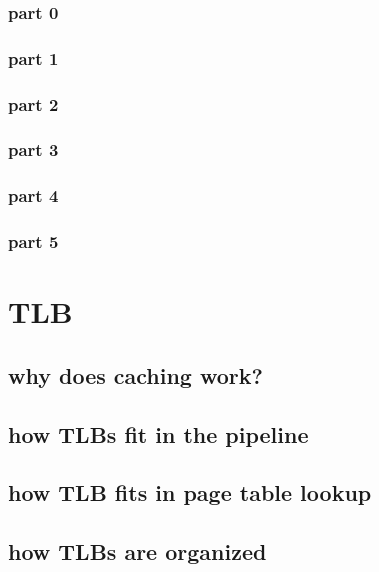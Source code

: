 \subsubsection{part 0}

\subsubsection{part 1}

\subsubsection{part 2}

\subsubsection{part 3}


\subsubsection{part 4}

\subsubsection{part 5}



\section{TLB}
\subsection{why does caching work?}


\subsection{how TLBs fit in the pipeline}


\subsection{how TLB fits in page table lookup}


\subsection{how TLBs are organized}

